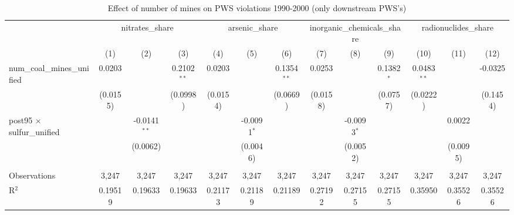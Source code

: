 
\begin{table}[htbp]
   \caption{\label{olsrf2sls_nummine_mine_vio_1990to2000dwnstrm_coalunified} Effect of number of mines on PWS violations 1990-2000 (only downstream PWS's)}
   \bigskip
   \centering
   \begin{adjustbox}{width = \textwidth, center}
      \begin{tabular}{lcccccccccccc}
         \toprule
          & \multicolumn{3}{c}{nitrates\_share} & \multicolumn{3}{c}{arsenic\_share} & \multicolumn{3}{c}{inorganic\_chemicals\_share} & \multicolumn{3}{c}{radionuclides\_share}\\
                                                          & (1)           & (2)            & (3)           & (4)           & (5)           & (6)           & (7)           & (8)           & (9)           & (10)          & (11)                 & (12)\\  
         \midrule 
         num\_coal\_mines\_unified                        & 0.0203        &                & 0.2102$^{**}$ & 0.0203        &               & 0.1354$^{**}$ & 0.0253        &               & 0.1382$^{*}$  & 0.0483$^{**}$ &                      & -0.0325\\   
                                                          & (0.0155)      &                & (0.0998)      & (0.0154)      &               & (0.0669)      & (0.0158)      &               & (0.0757)      & (0.0222)      &                      & (0.1454)\\   
         post95 $\times$ sulfur\_unified                  &               & -0.0141$^{**}$ &               &               & -0.0091$^{*}$ &               &               & -0.0093$^{*}$ &               &               & 0.0022               &   \\   
                                                          &               & (0.0062)       &               &               & (0.0046)      &               &               & (0.0052)      &               &               & (0.0095)             &   \\   
          \\
         Observations                                     & 3,247         & 3,247          & 3,247         & 3,247         & 3,247         & 3,247         & 3,247         & 3,247         & 3,247         & 3,247         & 3,247                & 3,247\\  
         R$^2$                                            & 0.19519       & 0.19633        & 0.19633       & 0.21173       & 0.21189       & 0.21189       & 0.27192       & 0.27155       & 0.27155       & 0.35950       & 0.35526              & 0.35526\\  

\end{tabular}
\end{adjustbox}
\end{table}
